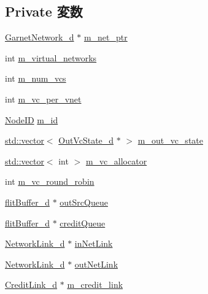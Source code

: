 \subsection*{Private 変数}
\begin{DoxyCompactItemize}
\item 
\hyperlink{classGarnetNetwork__d}{GarnetNetwork\_\-d} $\ast$ \hyperlink{classNetworkInterface__d_a9534b7843922554d9c1b429e50a11e6d}{m\_\-net\_\-ptr}
\item 
int \hyperlink{classNetworkInterface__d_af4cc96182e80059859793d92cb3dd769}{m\_\-virtual\_\-networks}
\item 
int \hyperlink{classNetworkInterface__d_a2e1a9213321dfa0386cdedaf6fc22996}{m\_\-num\_\-vcs}
\item 
int \hyperlink{classNetworkInterface__d_a2d66b8cad5144408ed492eeff4d37c2f}{m\_\-vc\_\-per\_\-vnet}
\item 
\hyperlink{TypeDefines_8hh_a83c14b4ae37e80071f6b3506a6c46151}{NodeID} \hyperlink{classNetworkInterface__d_aaed4e1d0badfbd8b21e43869898ed184}{m\_\-id}
\item 
\hyperlink{classstd_1_1vector}{std::vector}$<$ \hyperlink{classOutVcState__d}{OutVcState\_\-d} $\ast$ $>$ \hyperlink{classNetworkInterface__d_aadaadc7a32b7bf67a8c953eb3e9a13c7}{m\_\-out\_\-vc\_\-state}
\item 
\hyperlink{classstd_1_1vector}{std::vector}$<$ int $>$ \hyperlink{classNetworkInterface__d_a4e31a4f4aad8462157e797cdb1e3e00c}{m\_\-vc\_\-allocator}
\item 
int \hyperlink{classNetworkInterface__d_a4e50d04fbae98d5e7eac566ab56f4227}{m\_\-vc\_\-round\_\-robin}
\item 
\hyperlink{classflitBuffer__d}{flitBuffer\_\-d} $\ast$ \hyperlink{classNetworkInterface__d_aaf13976ec6e83029468aab14cef7c812}{outSrcQueue}
\item 
\hyperlink{classflitBuffer__d}{flitBuffer\_\-d} $\ast$ \hyperlink{classNetworkInterface__d_ab387c0eedaf4adb3f05beb4433c2e033}{creditQueue}
\item 
\hyperlink{classNetworkLink__d}{NetworkLink\_\-d} $\ast$ \hyperlink{classNetworkInterface__d_a32c70d9a8a19282b4cc9094e6b94c96f}{inNetLink}
\item 
\hyperlink{classNetworkLink__d}{NetworkLink\_\-d} $\ast$ \hyperlink{classNetworkInterface__d_ac6b53ee37454b0be010596ffff96d307}{outNetLink}
\item 
\hyperlink{classCreditLink__d}{CreditLink\_\-d} $\ast$ \hyperlink{classNetworkInterface__d_a8439db4fc7b7271dfca6bf98b13036a4}{m\_\-credit\_\-link}

\end{DoxyCompactItemize}
